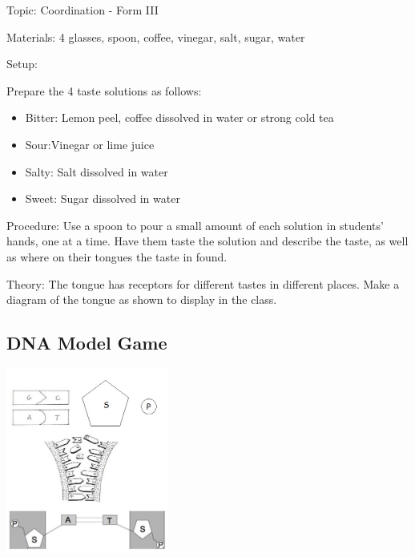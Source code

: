 \begin{multicols}{2}
\begin{description*}
\item[Topic:]{Coordination - Form III}
\item[Materials:]{4 glasses, spoon, coffee, vinegar, salt, sugar, water}
\item[Setup:]{Prepare the 4 taste solutions as follows:
\begin{itemize}
\item Bitter: Lemon peel, coffee dissolved in water or strong cold tea
\item Sour:Vinegar or lime juice
\item Salty: Salt dissolved in water
\item Sweet: Sugar dissolved in water
\end{itemize}}
\item[Procedure:]{Use a spoon to pour a small amount of each solution in students' hands, one at a time. Have them taste the solution and describe the taste, as well as where on their tongues the taste in found.}
\item[Theory:]{The tongue has receptors for different tastes in different places. Make a diagram of the tongue as shown to display in the class.}
\end{description*}

\subsection{DNA Model Game} %

\begin{center}
\includegraphics[width=0.4\textwidth]{./img/dna-game.jpg}
\end{center}


\end{multicols}
